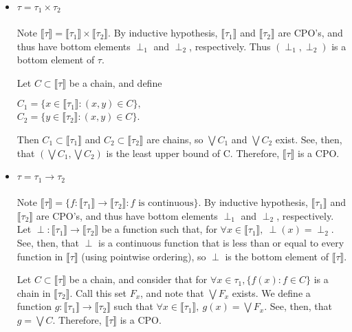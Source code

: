 \documentclass{westhesis}
\begin{document}
\begin{itemize}
\item $\tau = \tau_1 \times \tau_2$ \\ \\
Note $\llbracket \tau \rrbracket = \llbracket \tau_1 \rrbracket \times \llbracket \tau_2 \rrbracket$. By inductive hypothesis,
$\llbracket \tau_1 \rrbracket$ and $\llbracket \tau_2 \rrbracket$ are CPO's, and thus have bottom elements $\perp_1$ and $
\perp_2$, respectively. Thus $(\perp_1, \perp_2)$ is a bottom element of $\tau$. 

Let $C \subset \llbracket \tau \rrbracket$ be a
chain, and define
\begin{center}
$C_1 = \{x \in \llbracket \tau_1 \rrbracket : (x,y) \in C\},$ \\
$C_2 = \{ y \in \llbracket \tau_2 \rrbracket: (x,y) \in C\}$. \\ 
\end{center}
Then $C_1 \subset \llbracket \tau_1 \rrbracket$ and $C_2 \subset \llbracket \tau_2 \rrbracket$ are chains, so $\bigvee C_1$
and $\bigvee C_2$ exist. See, then, that $(\bigvee C_1, \bigvee C_2)$ is the least upper bound of C. Therefore, $\llbracket 
\tau \rrbracket$ is a CPO.
\item $\tau = \tau_1 \rightarrow \tau_2$ \\ \\
Note $\llbracket \tau \rrbracket = \{f : \llbracket \tau_1 \rrbracket \rightarrow \llbracket \tau_2 \rrbracket : f \text{ is continuous}\}
$. By inductive hypothesis, $\llbracket \tau_1 \rrbracket$ and $\llbracket \tau_2 \rrbracket$ are CPO's, and thus have bottom
elements $\perp_1$ and $\perp_2$, respectively. Let $\perp: \llbracket \tau_1 \rrbracket \rightarrow \llbracket \tau_2 
\rrbracket$ be a function such that, for $\forall x \in \llbracket \tau_1 \rrbracket, \ \perp(x) = \perp_2$. See, then, that 
$\perp$ is a continuous function that is less than or equal to every function in $\llbracket \tau \rrbracket$ (using pointwise
ordering), so $\perp$ is the bottom element of $\llbracket \tau \rrbracket$.  

Let $C \subset \llbracket \tau \rrbracket$ be a 
chain, and consider that for $\forall x \in \tau_1, \{f(x) : f \in C\}$ is a chain in $\llbracket \tau_2 \rrbracket$. Call this set $F_x$,
and note that $\bigvee F_x$ exists. We define a function $g: \llbracket \tau_1 \rrbracket \rightarrow \llbracket \tau_2 \rrbracket$ 
such that $\forall x \in \llbracket \tau_1 \rrbracket, \ g(x) = \bigvee F_x$. See, then, that $g = \bigvee C$. Therefore, $\llbracket
\tau \rrbracket$ is a CPO. \\
\end{itemize} 
\end{document}
